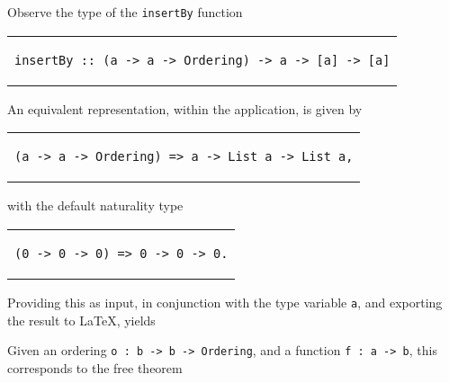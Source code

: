 \documentclass[../Dissertation.tex]{subfiles}
\begin{document}
\noindent
Observe the type of the \lstinline{insertBy} function
\begin{center}
\begin{tabular}{c}
\begin{lstlisting}
insertBy :: (a -> a -> Ordering) -> a -> [a] -> [a]
\end{lstlisting}
\end{tabular}
\end{center}
An equivalent representation, within the application, is given by
\begin{center}
\begin{tabular}{c}
\begin{lstlisting}
(a -> a -> Ordering) => a -> List a -> List a,
\end{lstlisting}
\end{tabular}
\end{center}
with the default naturality type
\begin{center}
\begin{tabular}{c}
\begin{lstlisting}
(0 -> 0 -> 0) => 0 -> 0 -> 0.
\end{lstlisting}
\end{tabular}
\end{center}
Providing this as input, in conjunction with the type variable \lstinline{a}, and exporting the result to LaTeX, yields
\begin{center}
\end{center}
\noindent
Given an ordering \lstinline{o : b -> b -> Ordering}, and a function \lstinline{f : a -> b}, this corresponds to the free theorem
\end{document}
